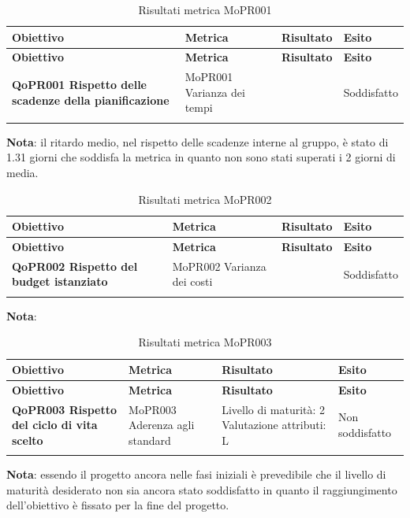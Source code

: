 \documentclass[../piano-di-qualifica.tex]{subfiles}
\begin{document}
\renewcommand{\arraystretch}{2} %
\begin{longtable}[H]{>{\centering\bfseries}m{5cm} >{\centering}m{5cm} >{\centering}m{2.5cm} >{\centering\arraybackslash}m{2.5cm}}  
  \rowcolor{lightgray}
  {\textbf{Obiettivo}} & {\textbf{Metrica}} & {\textbf{Risultato}} & {\textbf{Esito}}  \\
  \endfirsthead%
  \rowcolor{lightgray}
  {\textbf{Obiettivo}} & {\textbf{Metrica}} & {\textbf{Risultato}} & {\textbf{Esito}}  \\
  \endhead%
  \textbf{QoPR001 Rispetto delle scadenze della pianificazione} & MoPR001 Varianza dei tempi & 1.31 & Soddisfatto \\
  \caption{Risultati metrica MoPR001}
  \label{tab:my-table}
\end{longtable}
\textbf{Nota}: il ritardo medio, nel rispetto delle scadenze interne al gruppo, è stato di 1.31 giorni che soddisfa la metrica in quanto non sono stati superati i 2 giorni di media.

\renewcommand{\arraystretch}{2} %
\begin{longtable}[H]{>{\centering\bfseries}m{5cm} >{\centering}m{5cm} >{\centering}m{2.5cm} >{\centering\arraybackslash}m{2.5cm}}  
  \rowcolor{lightgray}
  {\textbf{Obiettivo}} & {\textbf{Metrica}} & {\textbf{Risultato}} & {\textbf{Esito}}  \\
  \endfirsthead%
  \rowcolor{lightgray}
  {\textbf{Obiettivo}} & {\textbf{Metrica}} & {\textbf{Risultato}} & {\textbf{Esito}}  \\
  \endhead%
  \textbf{QoPR002 Rispetto del budget istanziato} & MoPR002 Varianza dei costi &  & Soddisfatto \\
  \caption{Risultati metrica MoPR002}
  \label{tab:my-table}
\end{longtable}
\textbf{Nota}:

\renewcommand{\arraystretch}{2} %
\begin{longtable}[H]{>{\centering\bfseries}m{5cm} >{\centering}m{5cm} >{\centering}m{2.5cm} >{\centering\arraybackslash}m{2.5cm}}  
  \rowcolor{lightgray}
  {\textbf{Obiettivo}} & {\textbf{Metrica}} & {\textbf{Risultato}} & {\textbf{Esito}}  \\
  \endfirsthead%
  \rowcolor{lightgray}
  {\textbf{Obiettivo}} & {\textbf{Metrica}} & {\textbf{Risultato}} & {\textbf{Esito}}  \\
  \endhead%
  \textbf{QoPR003 Rispetto del ciclo di vita scelto} & MoPR003 Aderenza agli standard & Livello di maturità: 2 Valutazione attributi: L & Non soddisfatto \\
  \caption{Risultati metrica MoPR003}
  \label{tab:my-table}
\end{longtable}
\textbf{Nota}: essendo il progetto ancora nelle fasi iniziali è prevedibile che il livello di maturità desiderato non sia ancora stato soddisfatto in quanto il raggiungimento dell'obiettivo è fissato per la fine del progetto.
\end{document}
